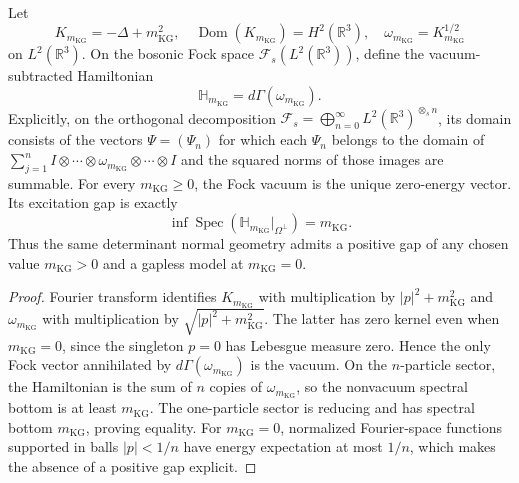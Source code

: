 \begin{theorem}
\label{hnsp-free-field-gap}
Let
\begin{equation}
 K_{m_{\mathrm{KG}}}=-\Delta+m_{\mathrm{KG}}^2,
 \quad \operatorname{Dom}(K_{m_{\mathrm{KG}}})=H^2(\mathbb R^3),
 \quad \omega_{m_{\mathrm{KG}}}=K_{m_{\mathrm{KG}}}^{1/2}
 \label{hnsp-one-particle-operator}
\end{equation}
on \(L^2(\mathbb R^3)\).  On the bosonic Fock space
\(\mathscr F_s(L^2(\mathbb R^3))\), define the vacuum-subtracted Hamiltonian
\begin{equation}
 \mathbb H_{m_{\mathrm{KG}}}=d\Gamma(\omega_{m_{\mathrm{KG}}}).
 \label{hnsp-free-fock-hamiltonian}
\end{equation}
Explicitly, on the orthogonal decomposition
\(\mathscr F_s=\bigoplus_{n=0}^\infty L^2(\mathbb R^3)^{\otimes_s n}\), its
domain consists of the vectors \(\Psi=(\Psi_n)\) for which each \(\Psi_n\)
belongs to the domain of
\(
 \sum_{j=1}^n I\otimes\cdots\otimes\omega_{m_{\mathrm{KG}}}\otimes\cdots\otimes I
\)
and the squared norms of those images are summable.
For every \(m_{\mathrm{KG}}\geq0\), the Fock vacuum is the unique zero-energy vector.  Its
excitation gap is exactly
\begin{equation}
 \inf\operatorname{Spec}(\mathbb H_{m_{\mathrm{KG}}}|_{\Omega^\perp})=m_{\mathrm{KG}}.
 \label{hnsp-free-gap-value}
\end{equation}
Thus the same determinant normal geometry admits a positive gap of any chosen
value \(m_{\mathrm{KG}}>0\) and a gapless model at \(m_{\mathrm{KG}}=0\).
\end{theorem}

\begin{proof}
Fourier transform identifies \(K_{m_{\mathrm{KG}}}\) with multiplication by
\(|p|^2+m_{\mathrm{KG}}^2\) and \(\omega_{m_{\mathrm{KG}}}\) with multiplication by
\(\sqrt{|p|^2+m_{\mathrm{KG}}^2}\).  The latter has zero kernel even when
\(m_{\mathrm{KG}}=0\), since
the singleton \(p=0\) has Lebesgue measure zero.  Hence the only Fock vector
annihilated by \(d\Gamma(\omega_{m_{\mathrm{KG}}})\) is the vacuum.  On the
\(n\)-particle sector, the Hamiltonian is the sum of \(n\) copies of
\(\omega_{m_{\mathrm{KG}}}\), so the nonvacuum spectral bottom is at least
\(m_{\mathrm{KG}}\).  The one-particle sector is reducing and has spectral
bottom \(m_{\mathrm{KG}}\), proving equality.  For \(m_{\mathrm{KG}}=0\),
normalized Fourier-space functions supported in balls \(|p|<1/n\) have
energy expectation at most \(1/n\), which makes the absence of a positive gap
explicit.
\end{proof}


